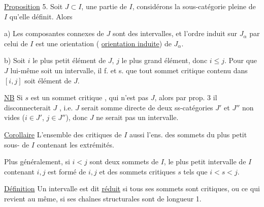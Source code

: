 \uline{Proposition} 5. Soit $J\subset I$,  une partie de $I$, considérons la sous-catégorie pleine de $I$ qu'elle définit. Alors

a) Les composantes connexes  de $J$ sont des intervalles,  et l'ordre induit sur  $J_\alpha$ par celui de $I$ est une orientation ( \uline{orientation induite}) de $J_\alpha$.


b)  Soit $i$ le plus petit élément de $J$, $j$ le plus grand élément,  donc $i\leq j$. Pour que $J$ lui-même soit un intervalle, il f. et s. que tout sommet critique contenu dans $[i,j]$ soit élément de $J$.

\uline{NB} Si $s$ \inserted{$\in[i,j]$} est un sommet critique  ,   qui n'est pas  $J$, alors par prop. 3 il disconnecterait $J$ , i.e. $J$ serait somme directe de deux ss-catégories $J'$ et $J''$ non vides ($i\in J'$, $j\in J''$), donc $J$ ne serait pas un intervalle.



\uline{Corollaire} L'ensemble des  critiques de $I$   aussi l'ens. des sommets du  plus petit sous-  de $I$ contenant les extrémités.

Plus généralement, si $i<j$ sont deux sommets de $I$, le plus petit   intervalle de $I$ contenant $i,j$ est formé de $i,j$ et des sommets critiques $s$ tels que $i<s<j$.

\uline{Définition} Un intervalle est dit \uline{réduit}  si tous ses sommets sont critiques, ou ce qui revient au même, si ses chaînes structurales sont de longueur 1.

